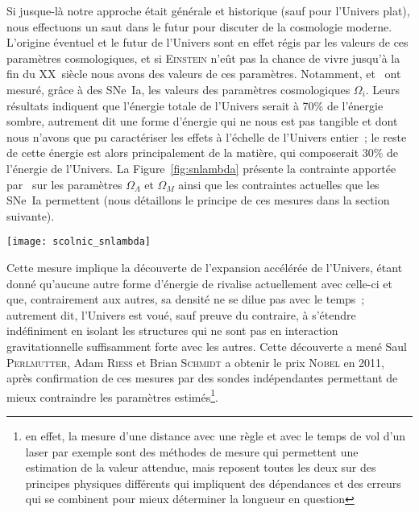 \documentclass[../main/main.tex]{subfiles}
\begin{document}
Si jusque-là notre approche était générale et historique (sauf pour l'Univers
plat), nous effectuons un saut dans le futur pour discuter de la cosmologie
moderne. L'origine éventuel et le futur de l'Univers sont en effet régis par les
valeurs de ces paramètres cosmologiques, et si \textsc{Einstein} n'eût pas la
chance de vivre jusqu'à la fin du XX\ieme~siècle nous avons des valeurs de ces
paramètres. Notamment, \cite{riess1998} et~\cite{perlmutter1999} ont mesuré,
grâce à des SNe~Ia, les valeurs des paramètres cosmologiques $\Omega_i$. Leurs
résultats indiquent que l'énergie totale de l'Univers serait à 70\% de l'énergie
sombre, autrement dit une forme d'énergie qui ne nous est pas tangible et dont
nous n'avons que pu caractériser les effets à l'échelle de l'Univers entier~; le
reste de cette énergie est alors principalement de la matière, qui composerait
30\% de l'énergie de l'Univers. La Figure~\ref{fig:snlambda} présente la
contrainte apportée par~\cite{riess1998} sur les paramètres $\Omega_\Lambda$ et
$\Omega_M$ ainsi que les contraintes actuelles que les SNe~Ia permettent (nous
détaillons le principe de ces mesures dans la section suivante).

\begin{SCfigure}[1][ht]
    \centering
    \texttt{[image: scolnic\_snlambda]}
    \caption[Contraintes sur les paramètres cosmologiques $\Omega_\Lambda$ et
    $\Omega_M$ par les SNe~Ia seulement]{Contraintes sur les paramètres
        cosmologiques $\Omega_\Lambda$ et $\Omega_M$ par les SNe~Ia seulement,
        mettant en évidence l'existence de l'énergie sombre. Les contours de
        confiance à 68 et 95\% sur les paramètres sont montrés pour les mesures
        de~\cite{riess1998} (R98 Discovery Sample) et celles de l'échantillon
        Pantheon \textit{en rouge}. Figure
    de~\cite{scolnic2018}.}\label{fig:snlambda}
\end{SCfigure}

Cette mesure implique la découverte de l'expansion accélérée de l'Univers, étant
donné qu'aucune autre forme d'énergie de rivalise actuellement avec celle-ci et
que, contrairement aux autres, sa densité ne se dilue pas avec le temps~;
autrement dit, l'Univers est voué, sauf preuve du contraire, à s'étendre
indéfiniment en isolant les structures qui ne sont pas en interaction
gravitationnelle suffisamment forte avec les autres. Cette découverte a mené
Saul \textsc{Perlmutter}, Adam \textsc{Riess} et Brian \textsc{Schmidt} a
obtenir le prix \textsc{Nobel} en 2011, après confirmation de ces mesures par
des sondes indépendantes permettant de mieux contraindre les paramètres
estimés\footnote{en effet, la mesure d'une distance avec une règle et avec le
    temps de vol d'un laser par exemple sont des méthodes de mesure qui
    permettent une estimation de la valeur attendue, mais reposent toutes les
    deux sur des principes physiques différents qui impliquent des dépendances
    et des erreurs qui se combinent pour mieux déterminer la longueur en
question}.
\end{document}
